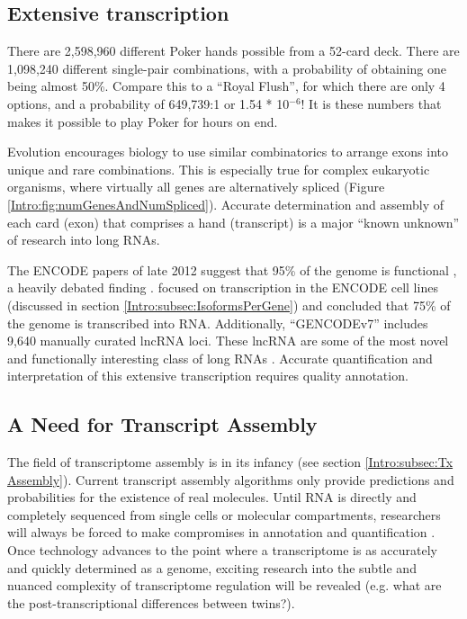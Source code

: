   \subsection{Extensive transcription}
    \label{Disc:subsec:Pervasive Tx}

    There are 2,598,960 different Poker hands possible from a 52-card deck. There are 1,098,240 different single-pair combinations, with a probability of obtaining one being almost 50\%. Compare this to a ``Royal Flush'', for which there are only 4 options, and a probability of 649,739:1 or 1.54 * 10$^{-6}$! It is these numbers that makes it possible to play Poker for hours on end. 

    Evolution encourages biology to use similar combinatorics to arrange exons into unique and rare combinations. This is especially true for complex eukaryotic organisms, where virtually all genes are alternatively spliced (Figure \ref{Intro:fig:numGenesAndNumSpliced}). Accurate determination and assembly of each card (exon) that comprises a hand (transcript) is a major ``known unknown'' \citep{Rumsfeld2011} of research into long RNAs.

    The ENCODE papers of late 2012 suggest that 95\% of the genome is functional \citep{Dunham2012}, a heavily debated finding \citep{Graur2013,Bhattacharjee2014}. \citet{Djebali2012} focused on transcription in the ENCODE cell lines (discussed in section \ref{Intro:subsec:IsoformsPerGene}) and concluded that 75\% of the genome is transcribed into RNA. Additionally, ``GENCODEv7'' includes 9,640 manually curated lncRNA loci. These lncRNA are some of the most novel and functionally interesting class of long RNAs \citep{Derrien2012,Pauli2011}. Accurate quantification and interpretation of this extensive transcription requires quality annotation.

  \subsection{A Need for Transcript Assembly}
    \label{Disc:subsec:need for Tx assembly}

    The field of transcriptome assembly is in its infancy (see section \ref{Intro:subsec:Tx Assembly}). Current transcript assembly algorithms only provide predictions and probabilities for the existence of real molecules. Until RNA is directly and completely sequenced from single cells or molecular compartments, researchers will always be forced to make compromises in annotation and quantification \citep{Ozsolak2010,Steijger2013}. Once technology advances to the point where a transcriptome is as accurately and quickly determined as a genome, exciting research into the subtle and nuanced complexity of transcriptome regulation will be revealed (e.g. what are the post-transcriptional differences between twins?).

